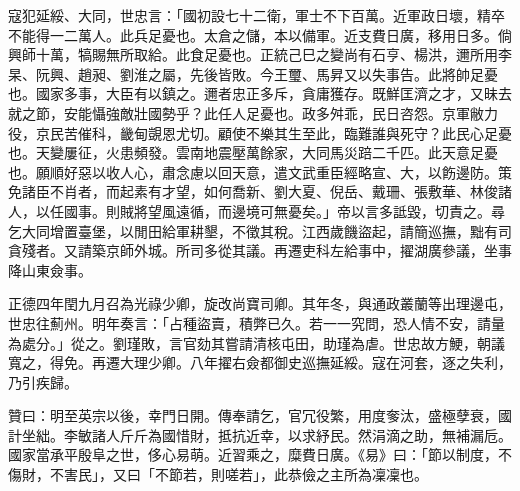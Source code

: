 \begin{pinyinscope}
寇犯延綏、大同，世忠言：「國初設七十二衛，軍士不下百萬。近軍政日壞，精卒不能得一二萬人。此兵足憂也。太倉之儲，本以備軍。近支費日廣，移用日多。倘興師十萬，犒賜無所取給。此食足憂也。正統己巳之變尚有石亨、楊洪，邇所用李杲、阮興、趙昶、劉淮之屬，先後皆敗。今王璽、馬昇又以失事告。此將帥足憂也。國家多事，大臣有以鎮之。邇者忠正多斥，貪庸獲存。既鮮匡濟之才，又昧去就之節，安能懾強敵壯國勢乎？此任人足憂也。政多舛乖，民日咨怨。京軍敝力役，京民苦催科，畿甸覬恩尤切。顧使不樂其生至此，臨難誰與死守？此民心足憂也。天變屢征，火患頻發。雲南地震壓萬餘家，大同馬災踣二千匹。此天意足憂也。願順好惡以收人心，肅念慮以回天意，遣文武重臣經略宣、大，以飭邊防。策免諸臣不肖者，而起素有才望，如何喬新、劉大夏、倪岳、戴珊、張敷華、林俊諸人，以任國事。則賊將望風遠循，而邊境可無憂矣。」帝以言多詆毀，切責之。尋乞大同增置臺堡，以閒田給軍耕墾，不徵其稅。江西歲饑盜起，請簡巡撫，黜有司貪殘者。又請築京師外城。所司多從其議。再遷吏科左給事中，擢湖廣參議，坐事降山東僉事。

正德四年閏九月召為光祿少卿，旋改尚寶司卿。其年冬，與通政叢蘭等出理邊屯，世忠往薊州。明年奏言：「占種盜賣，積弊已久。若一一究問，恐人情不安，請量為處分。」從之。劉瑾敗，言官劾其嘗請清核屯田，助瑾為虐。世忠故方鯁，朝議寬之，得免。再遷大理少卿。八年擢右僉都御史巡撫延綏。寇在河套，逐之失利，乃引疾歸。

贊曰：明至英宗以後，幸門日開。傳奉請乞，官冗役繁，用度奓汰，盛極孽衰，國計坐絀。李敏諸人斤斤為國惜財，抵抗近幸，以求紓民。然涓滴之助，無補漏卮。國家當承平殷阜之世，侈心易萌。近習乘之，糜費日廣。《易》曰：「節以制度，不傷財，不害民」，又曰「不節若，則嗟若」，此恭儉之主所為凜凜也。


\end{pinyinscope}